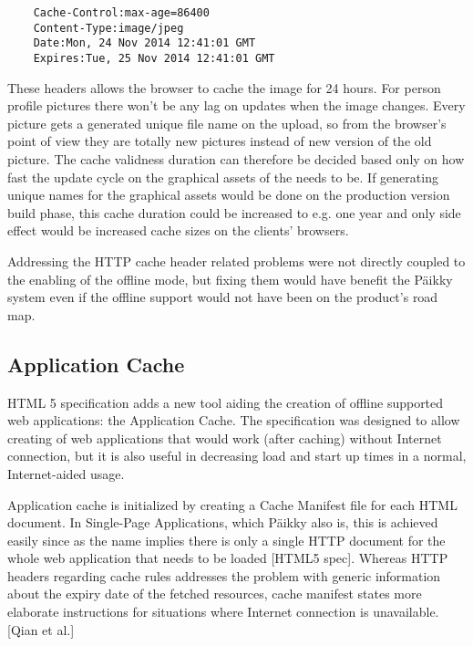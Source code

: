 \begin{lstlisting}
    Cache-Control:max-age=86400
    Content-Type:image/jpeg
    Date:Mon, 24 Nov 2014 12:41:01 GMT
    Expires:Tue, 25 Nov 2014 12:41:01 GMT
\end{lstlisting}
%
\noindent These headers allows the browser to cache the image for 24 hours. For person profile pictures there won't be any lag on updates when the image changes. Every picture gets a generated unique file name on the upload, so from the browser's point of view they are totally new pictures instead of new version of the old picture. The cache validness duration can therefore be decided based only on how fast the update cycle on the graphical assets of the needs to be. If generating unique names for the graphical assets would be done on the production version build phase, this cache duration could be increased to e.g. one year and only side effect would be increased cache sizes on the clients' browsers.

Addressing the HTTP cache header related problems were not directly coupled to the enabling of the offline mode, but fixing them would have benefit the Päikky system even if the offline support would not have been on the product's road map.







\subsection{Application Cache}


HTML 5 specification adds a new tool aiding the creation of offline supported web applications: the Application Cache. The specification was designed to allow creating of web applications that would work (after caching) without Internet connection, but it is also useful in decreasing load and start up times in a normal, Internet-aided usage. 

Application cache is initialized by creating a Cache Manifest file for each HTML document. In Single-Page Applications, which Päikky also is, this is achieved easily since as the name implies there is only a single HTTP document for the whole web application that needs to be loaded [HTML5 spec].  Whereas HTTP headers regarding cache rules addresses the problem with generic information about the expiry date of the fetched resources, cache manifest states more elaborate instructions for situations where Internet connection is unavailable. [Qian et al.]

